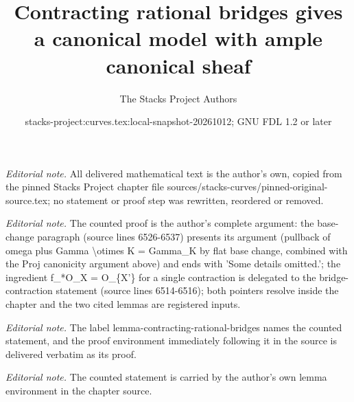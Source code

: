 \documentclass[10pt,a4paper]{amsart}
\title{Contracting rational bridges gives a canonical model with ample canonical sheaf}
\author{The Stacks Project Authors}
\date{stacks-project:curves.tex:local-snapshot-20261012; GNU FDL 1.2 or later}
\theoremstyle{plain}
\theoremstyle{definition}
\theoremstyle{remark}
\numberwithin{equation}{subsection}
\begin{document}
\maketitle
\noindent\textit{Editorial note.} All delivered mathematical text is the author's own, copied from the pinned Stacks Project chapter file sources/stacks-curves/pinned-original-source.tex; no statement or proof step was rewritten, reordered or removed.\par\medskip
\noindent\textit{Editorial note.} The counted proof is the author's complete argument: the base-change paragraph (source lines 6526-6537) presents its argument (pullback of omega plus Gamma \textbackslash{}otimes K = Gamma\_K by flat base change, combined with the Proj canonicity argument above) and ends with 'Some details omitted.'; the ingredient f\_*O\_X = O\_\{X'\} for a single contraction is delegated to the bridge-contraction statement (source lines 6514-6516); both pointers resolve inside the chapter and the two cited lemmas are registered inputs.\par\medskip
\noindent\textit{Editorial note.} The label lemma-contracting-rational-bridges names the counted statement, and the proof environment immediately following it in the source is delivered verbatim as its proof.\par\medskip
\noindent\textit{Editorial note.} The counted statement is carried by the author's own lemma environment in the chapter source.\par\medskip
\end{document}
